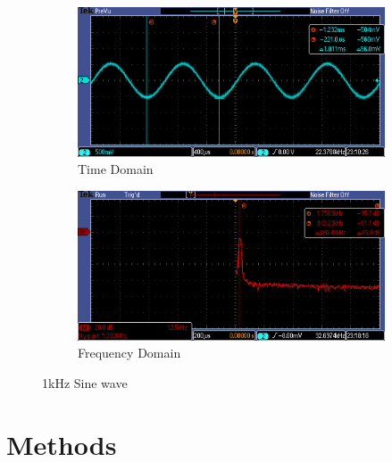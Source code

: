\documentclass{article}
\begin{document}
\begin{figure}[h]
  \begin{center}

    \begin{subfigure}[b]{0.5\linewidth}
      \includegraphics[width=\linewidth]{img/time_dom.png}
      \caption{Time Domain}
    \end{subfigure}

    \begin{subfigure}[b]{0.5\linewidth}
      \includegraphics[width=\linewidth]{img/freq_dom.png}
      \caption{Frequency Domain}
    \end{subfigure}

  \caption{1kHz Sine wave}
  \end{center}
\end{figure}

 

\section{Methods}
\end{document}
